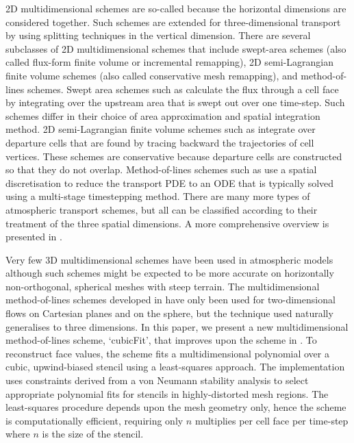 2D multidimensional schemes are so-called because the horizontal dimensions are considered together.  Such schemes are extended for three-dimensional transport by using splitting techniques in the vertical dimension.
There are several subclasses of 2D multidimensional schemes that include swept-area schemes (also called flux-form finite volume or incremental remapping), 2D semi-Lagrangian finite volume schemes (also called conservative mesh remapping), and method-of-lines schemes.
Swept area schemes such as \citep{lashley2002,skamarock-menchaca2010,lauritzen2011,thuburn2014} calculate the flux through a cell face by integrating over the upstream area that is swept out over one time-step.  Such schemes differ in their choice of area approximation and spatial integration method.
2D semi-Lagrangian finite volume schemes such as \citep{iske-kaeser2004,lauritzen2010} integrate over departure cells that are found by tracing backward the trajectories of cell vertices.  These schemes are conservative because departure cells are constructed so that they do not overlap.
Method-of-lines schemes such as \citep{weller2009,skamarock-gassmann2011} use a spatial discretisation to reduce the transport PDE to an ODE that is typically solved using a multi-stage timestepping method.
There are many more types of atmospheric transport schemes, but all can be classified according to their treatment of the three spatial dimensions.  A more comprehensive overview is presented in \cite{lauritzen2014}.

Very few 3D multidimensional schemes have been used in atmospheric models \citep[e.g.][]{gassmann2013} although such schemes might be expected to be more accurate on horizontally non-orthogonal, spherical meshes with steep terrain.  The multidimensional method-of-lines schemes developed in \citep{weller2009,weller-shahrokhi2014} have only been used for two-dimensional flows on Cartesian planes and on the sphere, but the technique used naturally generalises to three dimensions.
In this paper, we present a new multidimensional method-of-lines scheme, `cubicFit', that improves upon the scheme in \citep{weller-shahrokhi2014}.  To reconstruct face values, the scheme fits a multidimensional polynomial over a cubic, upwind-biased stencil using a least-squares approach.  The implementation uses constraints derived from a von Neumann stability analysis to select appropriate polynomial fits for stencils in highly-distorted mesh regions.  The least-squares procedure depends upon the mesh geometry only, hence the scheme is computationally efficient, requiring only $n$ multiplies per cell face per time-step where $n$ is the size of the stencil.


